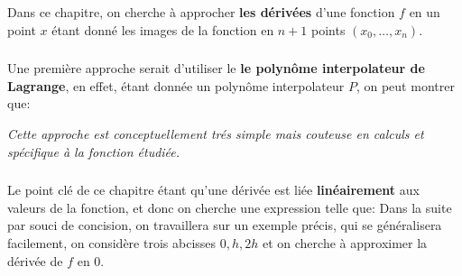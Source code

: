 \chapter*{}
Dans ce chapitre, on cherche à approcher \textbf{les dérivées} d'une fonction \(f\) en un point \(x\) étant donné les images de la fonction en \(n + 1\) points \((x_0, \ldots, x_n)\).

\subsection*{}
Une première approche serait d'utiliser le \textbf{le polynôme interpolateur de Lagrange}, en effet, étant donnée un polynôme interpolateur \(P\), on peut montrer que:
\begin{center}
   \textit{Cette approche est conceptuellement trés simple mais couteuse en calculs et spécifique à la fonction étudiée.}
\end{center}

\subsection*{}
Le point clé de ce chapitre étant qu'une dérivée est liée \textbf{linéairement} aux valeurs de la fonction, et donc on cherche une expression telle que:
Dans la suite par souci de concision, on travaillera sur un exemple précis, qui se généralisera facilement, on considère trois abcisses \(0, h, 2h\) et on cherche à approximer la dérivée de \(f\) en \(0\).\<

